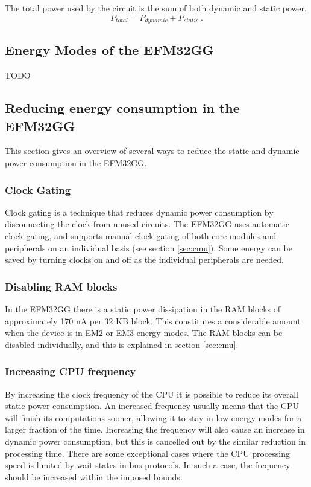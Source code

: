 The total power used by the circuit is the sum of both dynamic and static power,
$$P_{total} = P_{dynamic} + P_{static}\ .$$
\cite{cmos-vlsi-design}


\subsection{Energy Modes of the EFM32GG}
TODO %


\subsection{Reducing energy consumption in the EFM32GG}
This section gives an overview of several ways to reduce the static and dynamic power consumption in the EFM32GG.

\subsubsection{Clock Gating}
Clock gating is a technique that reduces dynamic power consumption by disconnecting the clock from unused circuits. The EFM32GG uses automatic clock gating, and supports manual clock gating of both core modules and peripherals on an individual basis (see section \ref{sec:cmu}). Some energy can be saved by turning clocks on and off as the individual peripherals are needed.\cite{efm32-energy-optimization} 


\subsubsection{Disabling RAM blocks}
In the EFM32GG there is a static power dissipation in the RAM blocks of approximately 170 nA per 32 KB block. This constitutes a considerable amount when the device is in EM2 or EM3 energy modes. The RAM blocks can be disabled individually, and this is explained in section \ref{sec:emu}.\cite{efm32-energy-optimization}


\subsubsection{Increasing CPU frequency}
By increasing the clock frequency of the CPU it is possible to reduce its overall static power consumption. An increased frequency usually means that the CPU will finish its computations sooner, allowing it to stay in low energy modes for a larger fraction of the time. Increasing the frequency will also cause an increase in dynamic power consumption, but this is cancelled out by the similar reduction in processing time. There are some exceptional cases where the CPU processing speed is limited by wait-states in bus protocols. In such a case, the frequency should be increased within the imposed bounds.\cite{efm32-energy-optimization}


